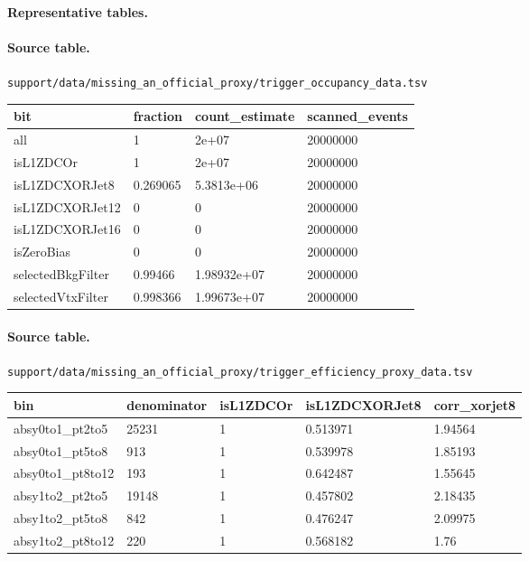 \documentclass[11pt]{article}
\begin{document}
\paragraph{Representative tables.}
\paragraph{Source table.} \texttt{support/data/missing\_an\_official\_proxy/trigger\_occupancy\_data.tsv}
\begin{center}\scriptsize
\begin{tabular}{|l|l|l|l|}
\hline
bit & fraction & count\_estimate & scanned\_events \\ \hline
all & 1 & 2e+07 & 20000000 \\ \hline
isL1ZDCOr & 1 & 2e+07 & 20000000 \\ \hline
isL1ZDCXORJet8 & 0.269065 & 5.3813e+06 & 20000000 \\ \hline
isL1ZDCXORJet12 & 0 & 0 & 20000000 \\ \hline
isL1ZDCXORJet16 & 0 & 0 & 20000000 \\ \hline
isZeroBias & 0 & 0 & 20000000 \\ \hline
selectedBkgFilter & 0.99466 & 1.98932e+07 & 20000000 \\ \hline
selectedVtxFilter & 0.998366 & 1.99673e+07 & 20000000 \\ \hline
\end{tabular}
\end{center}
\paragraph{Source table.} \texttt{support/data/missing\_an\_official\_proxy/trigger\_efficiency\_proxy\_data.tsv}
\begin{center}\scriptsize
\begin{tabular}{|l|l|l|l|l|}
\hline
bin & denominator & isL1ZDCOr & isL1ZDCXORJet8 & corr\_xorjet8 \\ \hline
absy0to1\_pt2to5 & 25231 & 1 & 0.513971 & 1.94564 \\ \hline
absy0to1\_pt5to8 & 913 & 1 & 0.539978 & 1.85193 \\ \hline
absy0to1\_pt8to12 & 193 & 1 & 0.642487 & 1.55645 \\ \hline
absy1to2\_pt2to5 & 19148 & 1 & 0.457802 & 2.18435 \\ \hline
absy1to2\_pt5to8 & 842 & 1 & 0.476247 & 2.09975 \\ \hline
absy1to2\_pt8to12 & 220 & 1 & 0.568182 & 1.76 \\ \hline
\end{tabular}
\end{center}
\end{document}
